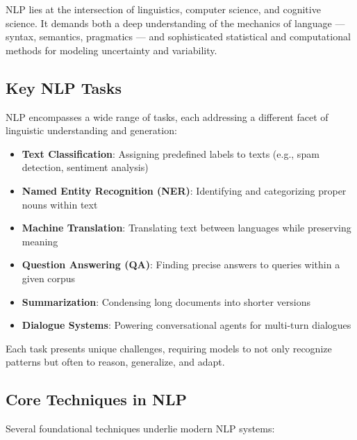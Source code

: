 \documentclass[openany]{book}
\begin{document}
NLP lies at the intersection of linguistics, computer science, and cognitive 
science. It demands both a deep understanding of the mechanics of language — 
syntax, semantics, pragmatics — and sophisticated statistical and computational 
methods for modeling uncertainty and variability.

\subsection{Key NLP Tasks}
NLP encompasses a wide range of tasks, each addressing a different facet of 
linguistic understanding and generation:

\begin{itemize}
    \item \textbf{Text Classification}: Assigning predefined labels to texts 
    (e.g., spam detection, sentiment analysis)
    \item \textbf{Named Entity Recognition (NER)}: Identifying and categorizing 
    proper nouns within text
    \item \textbf{Machine Translation}: Translating text between languages while 
    preserving meaning
    \item \textbf{Question Answering (QA)}: Finding precise answers to queries
     within a given corpus
    \item \textbf{Summarization}: Condensing long documents into shorter 
    versions
    \item \textbf{Dialogue Systems}: Powering conversational agents for 
    multi-turn dialogues
\end{itemize}

Each task presents unique challenges, requiring models to not only recognize 
patterns but often to reason, generalize, and adapt.

\subsection{Core Techniques in NLP}
Several foundational techniques underlie modern NLP systems:
\end{document}
